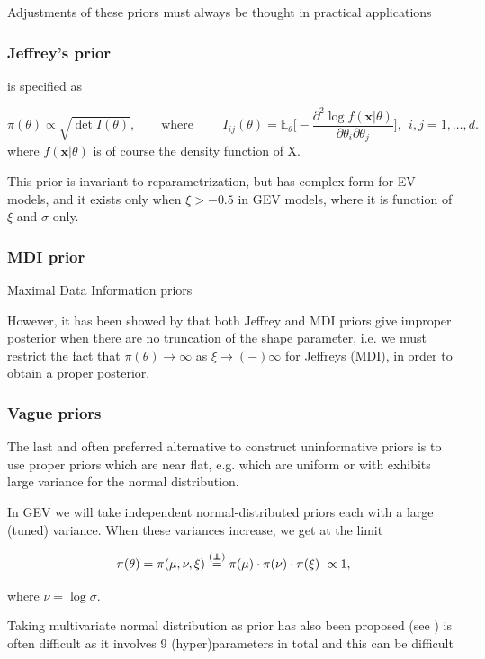 \documentclass[11pt,a4paper,openany ]{book}
\newcommand\independent{\protect\mathpalette{\protect\independenT}{\perp}}
\def\independenT#1#2{\mathrel{\rlap{$#1#2$}\mkern2mu{#1#2}}}
\begin{document}
Adjustments of these priors must always be thought in practical applications
\subsubsection*{Jeffrey's prior} 
is specified as 

\begin{equation}
\pi(\theta)\propto \sqrt{\det I(\theta)}, \qquad \text{where }\quad\quad I_{ij}(\theta)=\mathbb{E}_{\theta}\Bigg[-\frac{\partial^2\log f(\boldsymbol{x}|\theta)}{\partial\theta_i\partial\theta_j}\Bigg], \ \ i,j= 1,\dots,d.
\end{equation}
where $f(\boldsymbol{x}|\theta)$ is of course the density function of X.

This prior is invariant to reparametrization, but has complex form for EV models, and it exists only when $\xi>-0.5$ in GEV models, where it is function of $\xi$ and $\sigma$ only.


\subsubsection*{MDI prior}
Maximal Data Information priors


However, it has been showed by \cite{northrop_posterior_2016} that 
both Jeffrey and MDI priors give improper posterior when there are no truncation of the shape parameter, i.e. we must restrict the fact that $\pi(\theta)\rightarrow\infty$ as $\xi\rightarrow(-)\infty$ for Jeffreys (MDI), in order to obtain a proper posterior.

\subsubsection*{Vague priors}
The last and often preferred alternative to construct uninformative priors is to use proper priors which are near flat, e.g. which are uniform or with exhibits large variance for the normal distribution.

In GEV we will take independent normal-distributed priors each with a large (tuned) variance. When these variances increase, we get at the limit

\begin{equation}
\pi(\theta)=\pi(\mu,\nu,\xi)\stackrel{(\independent)}{=}\pi(\mu)\cdot\pi(\nu)\cdot\pi(\xi)\ \propto 1,
\end{equation}

where $\nu= \log\sigma$.

Taking multivariate normal distribution as prior has also been proposed (see ) is often difficult as it involves 9 (hyper)parameters in total and this can be difficult 
\end{document}
